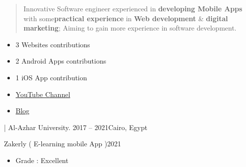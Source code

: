 \documentclass[10pt,a4paper,ragged2e,withhyper]{altacv}
\begin{document}
\begin{paracol}{2}
        \begin{quote}

            Innovative Software engineer experienced in \textbf{developing Mobile Apps} with some\textbf{practical experience}  in \textbf{Web development} \& \linebreak\textbf{digital marketing};
            Aiming to gain more experience in software development.

        \end{quote}

        \begin{itemize}
            \item 3 Websites contributions
            \item 2 Android Apps contributions
            \item 1 iOS App contribution

        \end{itemize}
        \divider

        \begin{itemize}
            \item  \href{https://www.youtube.com/c/LightFeather42}{YouTube Channel}
            \item  \href{https://lightfeather42.blogspot.com/}{Blog}

        \end{itemize}
        \divider
        \divider


        {| Al-Azhar University.}
        {2017 -- 2021}{Cairo, Egypt}
        \divider

        {Zakerly ( E-learning mobile App )}{2021}{}
        \begin{itemize}
            \item Grade : Excellent
        \end{itemize}
        \divider



\end{paracol}
\end{document}

